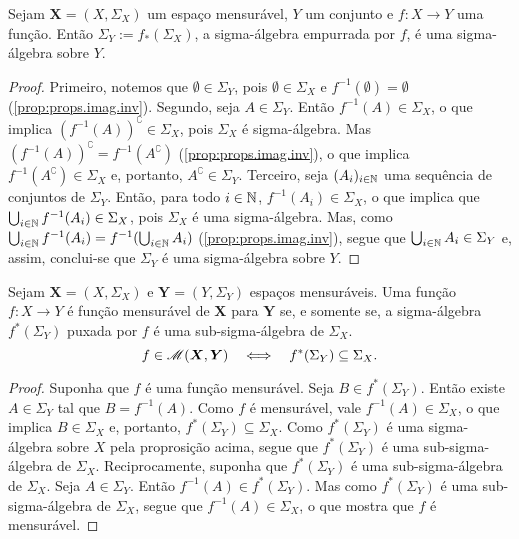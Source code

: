 \begin{prop}
Sejam $\bm X = (X,\Sigma_X)$ um espaço mensurável, $Y$ um conjunto e $f: X \to Y$ uma função. Então $\Sigma_Y := f_*(\Sigma_X)$, a sigma-álgebra empurrada por $f$, é uma sigma-álgebra sobre $Y$.
\end{prop}
\begin{proof}
Primeiro, notemos que $\emptyset \in \Sigma_Y$, pois $\emptyset \in \Sigma_X$ e $f^{-1}(\emptyset) = \emptyset$ (\ref{prop:props.imag.inv}). Segundo, seja $A \in \Sigma_Y$. Então $f^{-1}(A) \in \Sigma_ X$, o que implica $(f^{-1}(A))^\complement \in \Sigma_ X$, pois $\Sigma_ X$ é sigma-álgebra. Mas $(f^{-1}(A))^\complement = f^{-1}(A^\complement)$ (\ref{prop:props.imag.inv}), o que implica $f^{-1}(A^\complement) \in \Sigma_ X$ e, portanto, $A^\complement \in \Sigma_ Y$. Terceiro, seja $(A_i)_{i \in \mathbb{N}}$ uma sequência de conjuntos de $\Sigma_ Y$. Então, para todo $i \in \mathbb{N}$, $f^{-1}(A_i) \in \Sigma_ X$, o que implica que $\bigcup_{i \in \mathbb{N}} f^{-1}(A_i) \in \Sigma_ X$, pois $\Sigma_ X$ é uma sigma-álgebra. Mas, como $\bigcup_{i \in \mathbb{N}} f^{-1}(A_i) = f^{-1}(\bigcup_{i \in \mathbb{N}} A_i)$ (\ref{prop:props.imag.inv}), segue que $\bigcup_{i \in \mathbb{N}} A_i \in \Sigma_ Y$ e, assim, conclui-se que $\Sigma_ Y$ é uma sigma-álgebra sobre $Y$.
\end{proof}

\begin{prop}
Sejam $\bm X = (X,\Sigma_ X)$ e $\bm Y = (Y,\Sigma_ Y)$ espaços mensuráveis. Uma função $f: X \to Y$ é função mensurável de $\bm X$ para $\bm Y$ se, e somente se, a sigma-álgebra $f^*(\Sigma_Y)$ puxada por $f$ é uma sub-sigma-álgebra de $\Sigma_ X$.
	\begin{equation*}
	f \in \mathscr{M}(\bm X,\bm Y) \quad \Longleftrightarrow \quad f^*(\Sigma_Y) \subseteq \Sigma_X.
	\end{equation*}
\end{prop}
\begin{proof}
Suponha que $f$ é uma função mensurável. Seja $B \in f^*(\Sigma_Y)$. Então existe $A \in \Sigma_ Y$ tal que $B = f^{-1}(A)$. Como $f$ é mensurável, vale $f^{-1}(A) \in \Sigma_ X$, o que implica $B \in \Sigma_ X$ e, portanto, $f^*(\Sigma_Y) \subseteq \Sigma_ X$. Como $f^*(\Sigma_Y)$ é uma sigma-álgebra sobre $X$ pela proprosição acima, segue que $f^*(\Sigma_Y)$ é uma sub-sigma-álgebra de $\Sigma_ X$. Reciprocamente, suponha que $f^*(\Sigma_Y)$ é uma sub-sigma-álgebra de $\Sigma_ X$. Seja $A \in \Sigma_ Y$. Então $f^{-1}(A) \in f^*(\Sigma_Y)$. Mas como $f^*(\Sigma_Y)$ é uma sub-sigma-álgebra de $\Sigma_ X$, segue que $f^{-1}(A) \in \Sigma_ X$, o que mostra que $f$ é mensurável.
\end{proof}


